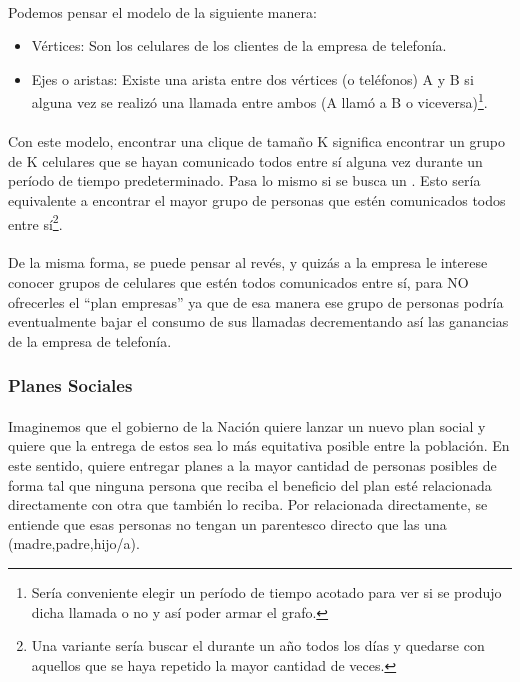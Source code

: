 \paragraph{}
Podemos pensar el modelo de la siguiente manera:
\begin{itemize}
  \item Vértices: Son los celulares de los clientes de la empresa de telefonía.
  \item Ejes o aristas: Existe una arista entre dos vértices (o teléfonos) A y B si alguna vez se realizó una llamada entre ambos (A llamó a B o viceversa)\footnote{Sería conveniente elegir un período de tiempo acotado para ver si se produjo dicha llamada o no y así poder armar el grafo.}.
\end{itemize}

\paragraph{}
Con este modelo, encontrar una clique de tamaño K significa encontrar un grupo de K celulares que se hayan comunicado todos entre sí alguna vez durante un período de tiempo predeterminado. Pasa lo mismo si se busca un \mc. Esto sería equivalente a encontrar el mayor grupo de personas que estén comunicados todos entre sí\footnote{Una variante sería buscar el \mc durante un año todos los días y quedarse con aquellos que se haya repetido la mayor cantidad de veces.}.

\paragraph{}
De la misma forma, se puede pensar al revés, y quizás a la empresa le interese conocer grupos de celulares que estén todos comunicados entre sí, para NO ofrecerles el ``plan empresas'' ya que de esa manera ese grupo de personas podría eventualmente bajar el consumo de sus llamadas decrementando así las ganancias de la empresa de telefonía.

\subsubsection{Planes Sociales}

\paragraph{}
Imaginemos que el gobierno de la Nación quiere lanzar un nuevo plan social y quiere que la entrega de estos sea lo más equitativa posible entre la población. En este sentido, quiere entregar planes a la mayor cantidad de personas posibles de forma tal que ninguna persona que reciba el beneficio del plan esté relacionada directamente con otra que también lo reciba. Por relacionada directamente, se entiende que esas personas no tengan un parentesco directo que las una (madre,padre,hijo/a).

